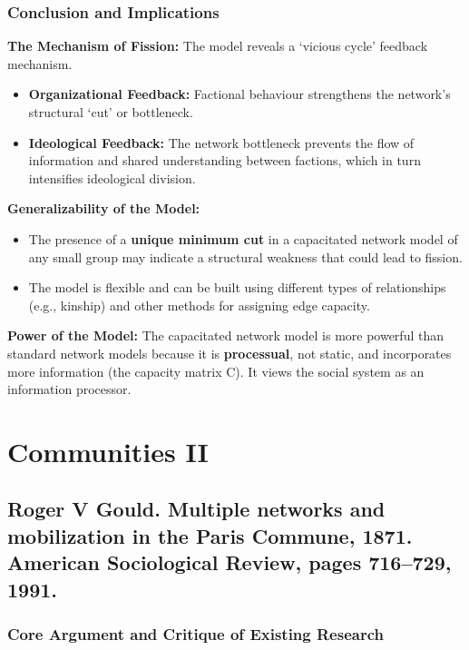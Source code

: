 \documentclass{article}
\begin{document}
    \subsubsection{Conclusion and Implications}

    \noindent \textbf{The Mechanism of Fission:} The model reveals a
`vicious cycle' feedback mechanism.
    \begin{itemize}
        \item \textbf{Organizational Feedback:} Factional behaviour
        strengthens the network's structural `cut' or bottleneck.
        \item \textbf{Ideological Feedback:} The network bottleneck prevents
        the flow of information and shared understanding between factions,
        which in turn intensifies ideological division.
    \end{itemize}

    \noindent \textbf{Generalizability of the Model:}
    \begin{itemize}
        \item The presence of a \textbf{unique minimum cut} in a capacitated
        network model of any small group may indicate a structural weakness
        that could lead to fission.
        \item The model is flexible and can be built using different types
        of relationships (e.g., kinship) and other methods for assigning
        edge capacity.
    \end{itemize}

    \noindent \textbf{Power of the Model:} The capacitated network model is
more powerful than standard network models because it is \textbf{processual}, not static, and incorporates more information (the capacity matrix C). It views the social system as an information processor.

    \section{Communities II}

    \subsection{Roger V Gould. Multiple networks and mobilization in the Paris Commune, 1871.
American Sociological Review, pages 716–729, 1991.}

    \subsubsection{Core Argument and Critique of Existing Research}
\end{document}
